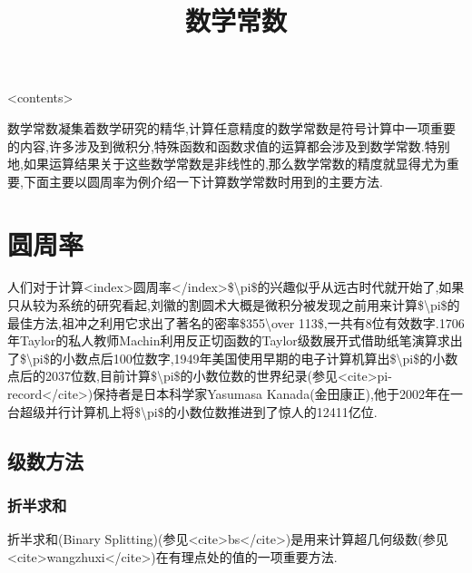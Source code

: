 \documentclass[
]{article}
\title{数学常数}
\author{}
\date{}
\begin{document}
\maketitle

\textless contents\textgreater{}

数学常数凝集着数学研究的精华,计算任意精度的数学常数是符号计算中一项重要的内容,许多涉及到微积分,特殊函数和函数求值的运算都会涉及到数学常数.特别地,如果运算结果关于这些数学常数是非线性的,那么数学常数的精度就显得尤为重要,下面主要以圆周率为例介绍一下计算数学常数时用到的主要方法.

\hypertarget{ux5706ux5468ux7387}{%
\section{圆周率}\label{ux5706ux5468ux7387}}

人们对于计算\textless index\textgreater 圆周率\textless/index\textgreater\$\textbackslash pi\$的兴趣似乎从远古时代就开始了,如果只从较为系统的研究看起,刘徽的割圆术大概是微积分被发现之前用来计算\$\textbackslash pi\$的最佳方法,祖冲之利用它求出了著名的密率\$355\textbackslash over
113\$,一共有8位有效数字.1706年Taylor的私人教师Machin利用反正切函数的Taylor级数展开式借助纸笔演算求出了\$\textbackslash pi\$的小数点后100位数字,1949年美国使用早期的电子计算机算出\$\textbackslash pi\$的小数点后的2037位数,目前计算\$\textbackslash pi\$的小数位数的世界纪录(参见\textless cite\textgreater pi-record\textless/cite\textgreater)保持者是日本科学家Yasumasa
Kanada(金田康正),他于2002年在一台超级并行计算机上将\$\textbackslash pi\$的小数位数推进到了惊人的12411亿位.

\hypertarget{ux7ea7ux6570ux65b9ux6cd5}{%
\subsection{级数方法}\label{ux7ea7ux6570ux65b9ux6cd5}}

\hypertarget{ux6298ux534aux6c42ux548c}{%
\subsubsection{折半求和}\label{ux6298ux534aux6c42ux548c}}

折半求和(Binary
Splitting)(参见\textless cite\textgreater bs\textless/cite\textgreater)是用来计算超几何级数(参见\textless cite\textgreater wangzhuxi\textless/cite\textgreater)在有理点处的值的一项重要方法.
\end{document}
